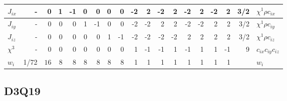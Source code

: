 \begin{table}
\begin{tabular}{|l|r|r|rrrrrr|rrrrrrrr|r|l|}
\hline
$J_{ix}$ & - &
 0 &  1 & -1 &  0 &  0 &  0 &  0 & -2 &  2 & -2 &  2 & -2 &  2 & -2 &  2 &
3/2 & $\chi^1 \rho c_{ix}$\\
\hline
$J_{iy}$ & - &
 0 &   0 &  0 &  1 & -1 &  0 &  0 & -2 & -2 &  2 &  2 & -2 & -2 &  2 &  2 &
3/2 & $\chi^1 \rho c_{iy}$\\
\hline
$J_{iz}$ & - &
 0 &   0 &  0 &  0 &  0 &  1 & -1 & -2 & -2 & -2 & -2 &  2 &  2 &  2 &  2 &
3/2 & $\chi^1 \rho c_{iz}$\\
\hline
$\chi^3$ & - &
 0 &   0 &  0 &  0 &  0 &  0 &  0 &  1 & -1 & -1 &  1 & -1 &  1 &  1 & -1 &
9 & $c_{ix} c_{iy} c_{iz}$ \\
\hline\hline
$w_i$ & 1/72 &
$16$ & 8 & 8 & 8 & 8 & 8 & 8 & 1 & 1 & 1 & 1 & 1 & 1 & 1 & 1 &
 & $w_i$\\
\hline\hline
\end{tabular}
\end{table}


\subsection{D3Q19}

